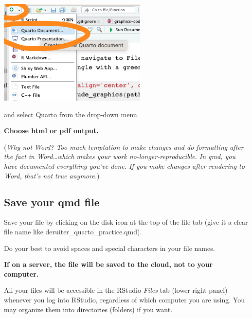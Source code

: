 \documentclass[
  letterpaper,
  DIV=11,
  numbers=noendperiod]{scrreprt}
\theoremstyle{remark}
\begin{document}
\begin{center}
\includegraphics[width=0.85\linewidth,height=\textheight,keepaspectratio]{images/new-quarto-document.png}
\end{center}

and select Quarto from the drop-down menu.

\textbf{Choose html or pdf output.}

(\emph{Why not Word? Too much temptation to make changes and do
formatting after the fact in Word\ldots which makes your work
no-longer-reproducible. In qmd, you have documented everything you've
done. If you make changes after rendering to Word, that's not true
anymore.})

\subsection{Save your qmd file}\label{save-your-qmd-file}

Save your file by clicking on the disk icon at the top of the file tab
(give it a clear file name like deruiter\_quarto\_practice.qmd).

Do your best to avoid spaces and special characters in your file names.

\textbf{If on a server, the file will be saved to the cloud, not to your
computer.}

All your files will be accessible in the RStudio \emph{Files} tab (lower
right panel) whenever you log into RStudio, regardless of which computer
you are using. You may organize them into directories (folders) if you
want.
\end{document}
